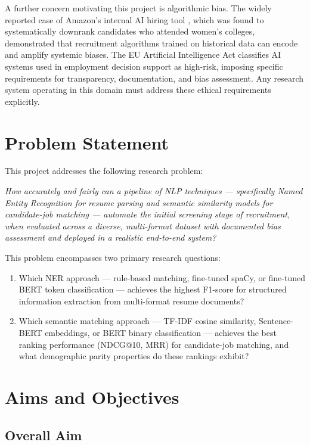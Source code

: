A further concern motivating this project is algorithmic bias. The widely reported case of Amazon's internal AI hiring tool \citep{Dastin2018}, which was found to systematically downrank candidates who attended women's colleges, demonstrated that recruitment algorithms trained on historical data can encode and amplify systemic biases. The EU Artificial Intelligence Act \citep{EUAIAct2024} classifies AI systems used in employment decision support as high-risk, imposing specific requirements for transparency, documentation, and bias assessment. Any research system operating in this domain must address these ethical requirements explicitly.

\section{Problem Statement}

This project addresses the following research problem:

\textit{How accurately and fairly can a pipeline of NLP techniques --- specifically Named Entity Recognition for resume parsing and semantic similarity models for candidate-job matching --- automate the initial screening stage of recruitment, when evaluated across a diverse, multi-format dataset with documented bias assessment and deployed in a realistic end-to-end system?}

This problem encompasses two primary research questions:
\begin{enumerate}
    \item Which NER approach --- rule-based matching, fine-tuned spaCy, or fine-tuned BERT token classification --- achieves the highest F1-score for structured information extraction from multi-format resume documents?
    \item Which semantic matching approach --- TF-IDF cosine similarity, Sentence-BERT embeddings, or BERT binary classification --- achieves the best ranking performance (NDCG@10, MRR) for candidate-job matching, and what demographic parity properties do these rankings exhibit?
\end{enumerate}

\section{Aims and Objectives}

\subsection{Overall Aim}

